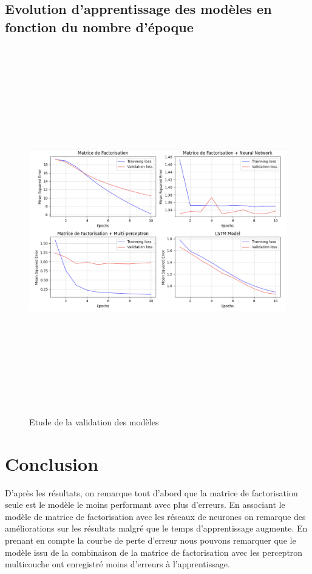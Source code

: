 \subsection{Evolution d'apprentissage des modèles en fonction du nombre d'époque}
\begin{figure}[!htb]
\begin{center}
\includegraphics[width=16cm,height=16cm]{images/model_evaluation.png}
\caption[Etude de la validation des modèles]{Etude de la validation des modèles}
\label{monlabel}
\end{center}
\end{figure}

\clearpage
\section{Conclusion}
D'après les résultats, on remarque tout d’abord que la matrice de factorisation seule est le modèle le moins performant avec plus d'erreurs. En associant le modèle de matrice de factorisation avec les réseaux de neurones on remarque des améliorations sur les résultats malgré que le temps d’apprentissage augmente. En prenant en compte la courbe de perte d’erreur nous pouvons remarquer que le modèle issu de la combinaison de la matrice de factorisation avec les perceptron multicouche ont enregistré moins d'erreurs à l’apprentissage.